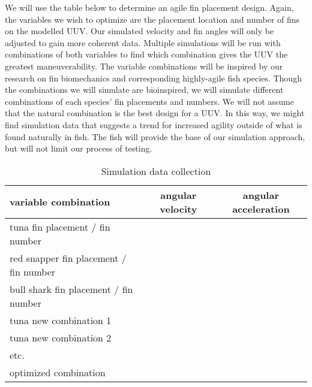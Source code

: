 \documentclass{IEEEtran}
\begin{document}
We will use the table below to determine an agile fin placement design. Again, the variables we wish to optimize are the placement location and number of fins on the modelled UUV. Our simulated velocity and fin angles will only be adjusted to gain more coherent data. Multiple simulations will be run with combinations of both variables to find which combination gives the UUV the greatest maneuverability. The variable combinations will be inspired by our research on fin biomechanics and corresponding highly-agile fish species. Though the combinations we will simulate are bioinspired, we will simulate different combinations of each species’ fin placements and numbers. We will not assume that the natural combination is the best design for a UUV. In this way, we might find simulation data that suggests a trend for increased agility outside of what is found naturally in fish. The fish will provide the base of our simulation approach, but will not limit our process of testing.
\begin{table*}
\caption{Simulation data collection}
\label{tab:1}
\begin{center}
\begin{tabular}{lcc}
\toprule
variable combination & angular velocity & angular acceleration \\
\midrule
tuna fin placement / fin number & & \\
red snapper fin placement / fin number & & \\
bull shark fin placement / fin number & & \\
tuna new combination 1 & & \\
tuna new combination 2 & & \\
etc. & & \\
optimized combination & & \\
\bottomrule
\end{tabular}
\end{center}
\end{table*}
\end{document}
